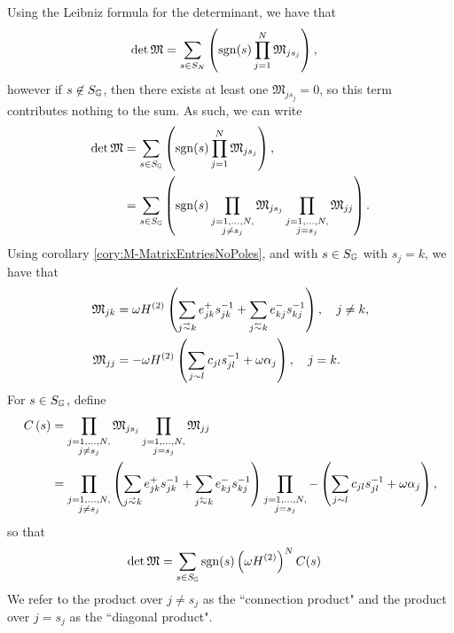 Using the Leibniz formula for the determinant, we have that
\begin{align*}
	\det\mathfrak{M} &= \sum_{s\in S_N} \left(  \mathrm{sgn}(s) \prod_{j=1}^N \mathfrak{M}_{j s_j}  \right),
\end{align*}
however if $s\not\in S_{\mathbb{G}}$, then there exists at least one $\mathfrak{M}_{j s_j}=0$, so this term contributes nothing to the sum.
As such, we can write
\begin{align*}
	\det\mathfrak{M} &= \sum_{s\in S_{\mathbb{G}}} \left(  \mathrm{sgn}(s) \prod_{j=1}^N \mathfrak{M}_{j s_j}  \right), \\
	&= \sum_{s\in S_{\mathbb{G}}} \left(  \mathrm{sgn}(s) \prod_{\substack{j=1,...,N, \\ j\neq s_j}} \mathfrak{M}_{j s_j} \prod_{\substack{j=1,...,N, \\ j = s_j}} \mathfrak{M}_{jj}  \right).
\end{align*}
Using corollary \ref{cory:M-MatrixEntriesNoPoles}, and with $s\in S_{\mathbb{G}}$ with $s_j = k$, we have that
\begin{align*}
	\mathfrak{M}_{jk} &= \omega H^{(2)} \bracs{ \sum_{j\conLeft k}e_{jk}^+ s_{jk}^{-1} + \sum_{j\conRight k}e_{kj}^- s_{kj}^{-1} }, \quad j\neq k, \\
	\mathfrak{M}_{jj} &= -\omega H^{(2)} \bracs{ \sum_{j\con l}c_{jl}s_{jl}^{-1} + \omega\alpha_j }, \quad j=k.
\end{align*}
For $s\in S_{\mathbb{G}}$, define
\begin{align*}
	C\bracs{s} &= \prod_{\substack{j=1,...,N, \\ j\neq s_j}} \mathfrak{M}_{j s_j} \prod_{\substack{j=1,...,N, \\ j = s_j}} \mathfrak{M}_{jj} \\
	&= \prod_{\substack{j=1,...,N, \\ j\neq s_j}} \bracs{ \sum_{j\conLeft k}e_{jk}^+ s_{jk}^{-1} + \sum_{j\conRight k}e_{kj}^- s_{kj}^{-1} } \prod_{\substack{j=1,...,N, \\ j = s_j}} -\bracs{ \sum_{j\con l}c_{jl}s_{jl}^{-1} + \omega\alpha_j },
\end{align*}
so that 
\begin{align*}
	\det\mathfrak{M} &= \sum_{s\in S_{\mathbb{G}}} \mathrm{sgn}(s) \left(  \omega H^{(2)}  \right)^N  C(s)
\end{align*}
We refer to the product over $j\neq s_j$ as the ``connection product" and the product over $j=s_j$ as the ``diagonal product".

